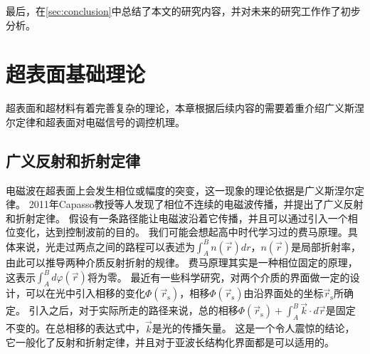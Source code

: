 \documentclass[supercite]{HustGraduPaper}
\begin{document}
最后，在\autoref{sec:conclusion}中总结了本文的研究内容，并对未来的研究工作作了初步分析。

\section{超表面基础理论}\label{sec:theory}

超表面和超材料有着完善复杂的理论，本章根据后续内容的需要着重介绍广义斯涅尔定律和超表面对电磁信号的调控机理。

\subsection{广义反射和折射定律}\label{subsec:snell-law}

电磁波在超表面上会发生相位或幅度的突变，这一现象的理论依据是广义斯涅尔定律\cite{9326394}。
2011年Capasso教授等人发现了相位不连续的电磁波传播，并提出了广义反射和折射定律\cite{yu2011light}。
假设有一条路径能让电磁波沿着它传播，并且可以通过引入一个相位变化，达到控制波前的目的。
我们可能会想起高中时代学习过的费马原理。具体来说，光走过两点之间的路程可以表述为$ \int_{A}^{B} n(\vec{r}) dr $，$ n(\vec{r}) $是局部折射率，由此可以推导两种介质反射折射的规律。
费马原理其实是一种相位固定的原理\cite{feynman2010quantum}，这表示$ \int_{A}^{B} d \varphi (\vec{r}) $将为零。
最近有一些科学研究，对两个介质的界面做一定的设计，可以在光中引入相移的变化$ \Phi (\vec{r}_\mathrm{s}) $，相移$ \Phi (\vec{r}_\mathrm{s}) $由沿界面处的坐标$ \vec{r}_\mathrm{s} $所确定。
引入之后，对于实际所走的路径来说，总的相移$ \Phi\left(\vec{r}_{\mathrm{s}}\right)+\int_{A}^{B} \vec{k} \cdot d \vec{r} $是固定不变的。在总相移的表达式中，$ \vec{k} $是光的传播矢量。
这是一个令人震惊的结论，它一般化了反射和折射定律，并且对于亚波长结构化界面都是可以适用的。
\end{document}
